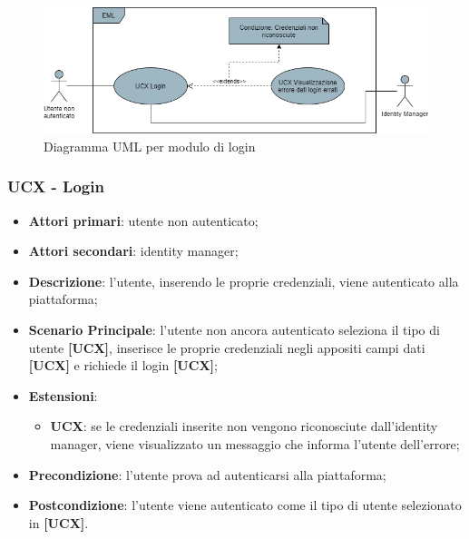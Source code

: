 \begin{figure}[H]
\centering
\includegraphics[scale=0.6]{res/UseCase/Immagini/Login}
\caption{Diagramma UML per modulo di login}
\end{figure}

\subsubsection{UCX - Login}
\begin{itemize}
\item \textbf{Attori primari}: utente non autenticato;
\item \textbf{Attori secondari}: identity manager;
\item \textbf{Descrizione}: l'utente, inserendo le proprie credenziali, viene autenticato alla piattaforma;
\item \textbf{Scenario Principale}: l'utente non ancora autenticato seleziona il tipo di utente \textbf{[UCX]}, inserisce le proprie credenziali negli appositi campi dati \textbf{[UCX]} e richiede il login \textbf{[UCX]};
\item \textbf{Estensioni}:
\begin{itemize}
	\item \textbf{UCX}: se le credenziali inserite non vengono riconosciute dall'identity manager, viene visualizzato un messaggio che informa l'utente dell'errore;
\end{itemize}
\item \textbf{Precondizione}: l'utente prova ad autenticarsi alla piattaforma;
\item \textbf{Postcondizione}: l'utente viene autenticato come il tipo di utente selezionato in \textbf{[UCX]}.
\end{itemize}

